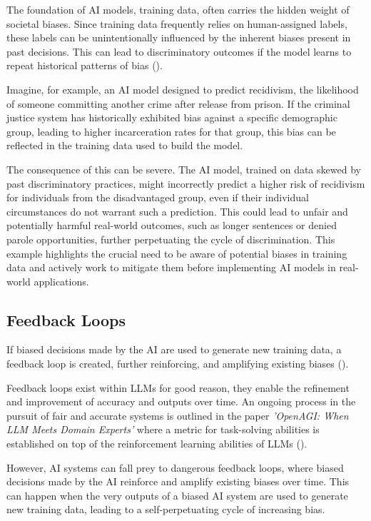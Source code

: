\documentclass[12pt]{article}
\begin{document}
The foundation of AI models, training data, often carries the hidden weight of societal biases. Since training data frequently relies on human-assigned labels, these labels can be unintentionally influenced by the inherent biases present in past decisions. This can lead to discriminatory outcomes if the model learns to repeat historical patterns of bias (\cite{liao-2023}).

Imagine, for example, an AI model designed to predict recidivism, the likelihood of someone committing another crime after release from prison. If the criminal justice system has historically exhibited bias against a specific demographic group, leading to higher incarceration rates for that group, this bias can be reflected in the training data used to build the model.

The consequence of this can be severe. The AI model, trained on data skewed by past discriminatory practices, might incorrectly predict a higher risk of recidivism for individuals from the disadvantaged group, even if their individual circumstances do not warrant such a prediction. This could lead to unfair and potentially harmful real-world outcomes, such as longer sentences or denied parole opportunities, further perpetuating the cycle of discrimination. This example highlights the crucial need to be aware of potential biases in training data and actively work to mitigate them before implementing AI models in real-world applications.

\subsection{Feedback Loops}

If biased decisions made by the AI are used to generate new training data, a feedback loop is created, further reinforcing, and amplifying existing biases (\cite{pan-2024}). 

Feedback loops exist within LLMs for good reason, they enable the refinement and improvement of accuracy and outputs over time. An ongoing process in the pursuit of fair and accurate systems is outlined in the paper \textit{'OpenAGI: When LLM Meets Domain Experts'} where a metric for task-solving abilities is established on top of the reinforcement learning abilities of LLMs (\cite{openagi-feedbackloops}).

However, AI systems can fall prey to dangerous feedback loops, where biased decisions made by the AI reinforce and amplify existing biases over time. This can happen when the very outputs of a biased AI system are used to generate new training data, leading to a self-perpetuating cycle of increasing bias.
\end{document}
